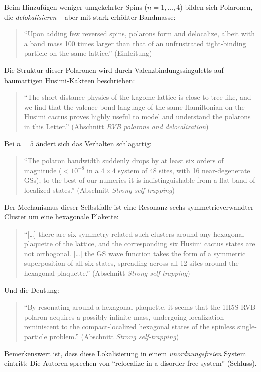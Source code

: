 Beim Hinzufügen weniger umgekehrter Spins ($n=1,\ldots,4$) bilden sich
Polaronen, die \emph{delokalisieren} -- aber mit stark erhöhter Bandmasse:
\begin{quote}\QM
\enquote{Upon adding few reversed spins, polarons form and delocalize, albeit
with a band mass 100 times larger than that of an unfrustrated tight-binding
particle on the same lattice.} (Einleitung)
\end{quote}
Die Struktur dieser Polaronen wird durch Valenzbindungssinguletts auf
baumartigen Husimi-Kakteen beschrieben:
\begin{quote}\QM
\enquote{The short distance physics of the kagome lattice is close to
tree-like, and we find that the valence bond language of the same Hamiltonian
on the Husimi cactus proves highly useful to model and understand the polarons
in this Letter.} (Abschnitt \emph{RVB polarons and delocalization})
\end{quote}
Bei $n=5$ ändert sich das Verhalten schlagartig:
\begin{quote}\QM
\enquote{The polaron bandwidth suddenly drops by at least six orders of
magnitude ($<10^{-8}$ in a $4\times4$ system of 48 sites, with 16
near-degenerate GSs); to the best of our numerics it is indistinguishable
from a flat band of localized states.} (Abschnitt \emph{Strong self-trapping})
\end{quote}
Der Mechanismus dieser Selbstfalle ist eine Resonanz sechs
symmetrieverwandter Cluster um eine hexagonale Plakette:
\begin{quote}\QM
\enquote{[\ldots] there are six symmetry-related such clusters around any
hexagonal plaquette of the lattice, and the corresponding six Husimi cactus
states are not orthogonal. [\ldots] the GS wave function takes the form of a
symmetric superposition of all six states, spreading across all 12 sites
around the hexagonal plaquette.} (Abschnitt \emph{Strong self-trapping})
\end{quote}
Und die Deutung:
\begin{quote}\QM
\enquote{By resonating around a hexagonal plaquette, it seems that the 1H5S
RVB polaron acquires a possibly infinite mass, undergoing localization
reminiscent to the compact-localized hexagonal states of the spinless
single-particle problem.} (Abschnitt \emph{Strong self-trapping})
\end{quote}
Bemerkenswert ist, dass diese Lokalisierung in einem \emph{unordnungsfreien}
System eintritt: Die Autoren sprechen von \enquote{relocalize in a
disorder-free system} (Schluss).

